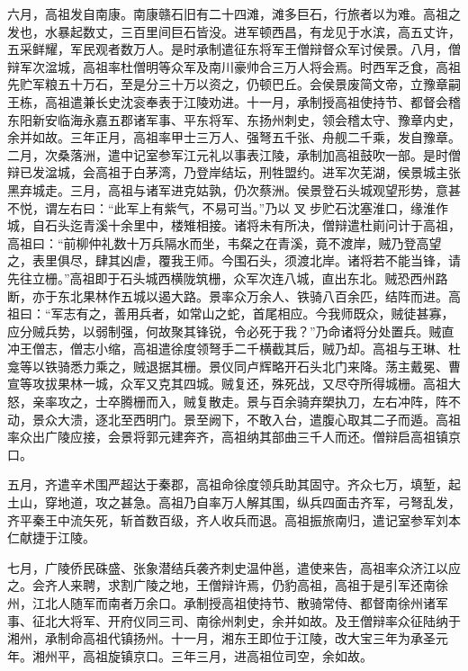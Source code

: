 \documentclass[]{article}
\begin{document}
六月，高祖发自南康。南康赣石旧有二十四滩，滩多巨石，行旅者以为难。高祖之发也，水暴起数丈，三百里间巨石皆没。进军顿西昌，有龙见于水滨，高五丈许，五采鲜耀，军民观者数万人。是时承制遣征东将军王僧辩督众军讨侯景。八月，僧辩军次湓城，高祖率杜僧明等众军及南川豪帅合三万人将会焉。时西军乏食，高祖先贮军粮五十万石，至是分三十万以资之，仍顿巴丘。会侯景废简文帝，立豫章嗣王栋，高祖遣兼长史沈衮奉表于江陵劝进。十一月，承制授高祖使持节、都督会稽东阳新安临海永嘉五郡诸军事、平东将军、东扬州刺史，领会稽太守、豫章内史，余并如故。三年正月，高祖率甲士三万人、强弩五千张、舟舰二千乘，发自豫章。二月，次桑落洲，遣中记室参军江元礼以事表江陵，承制加高祖鼓吹一部。是时僧辩已发湓城，会高祖于白茅湾，乃登岸结坛，刑牲盟约。进军次芜湖，侯景城主张黑弃城走。三月，高祖与诸军进克姑孰，仍次蔡洲。侯景登石头城观望形势，意甚不悦，谓左右曰：``此军上有紫气，不易可当。''乃以叉步贮石沈塞淮口，缘淮作城，自石头迄青溪十余里中，楼雉相接。诸将未有所决，僧辩遣杜崱问计于高祖，高祖曰：``前柳仲礼数十万兵隔水而坐，韦粲之在青溪，竟不渡岸，贼乃登高望之，表里俱尽，肆其凶虐，覆我王师。今围石头，须渡北岸。诸将若不能当锋，请先往立栅。''高祖即于石头城西横陇筑栅，众军次连八城，直出东北。贼恐西州路断，亦于东北果林作五城以遏大路。景率众万余人、铁骑八百余匹，结阵而进。高祖曰：``军志有之，善用兵者，如常山之蛇，首尾相应。今我师既众，贼徒甚寡，应分贼兵势，以弱制强，何故聚其锋锐，令必死于我？''乃命诸将分处置兵。贼直冲王僧志，僧志小缩，高祖遣徐度领弩手二千横截其后，贼乃却。高祖与王琳、杜龛等以铁骑悉力乘之，贼退据其栅。景仪同卢辉略开石头北门来降。荡主戴冕、曹宣等攻拔果林一城，众军又克其四城。贼复还，殊死战，又尽夺所得城栅。高祖大怒，亲率攻之，士卒腾栅而入，贼复散走。景与百余骑弃槊执刀，左右冲阵，阵不动，景众大溃，逐北至西明门。景至阙下，不敢入台，遣腹心取其二子而遁。高祖率众出广陵应接，会景将郭元建奔齐，高祖纳其部曲三千人而还。僧辩启高祖镇京口。

五月，齐遣辛术围严超达于秦郡，高祖命徐度领兵助其固守。齐众七万，填堑，起土山，穿地道，攻之甚急。高祖乃自率万人解其围，纵兵四面击齐军，弓弩乱发，齐平秦王中流矢死，斩首数百级，齐人收兵而退。高祖振旅南归，遣记室参军刘本仁献捷于江陵。

七月，广陵侨民硃盛、张象潜结兵袭齐刺史温仲邕，遣使来告，高祖率众济江以应之。会齐人来聘，求割广陵之地，王僧辩许焉，仍豹高祖，高祖于是引军还南徐州，江北人随军而南者万余口。承制授高祖使持节、散骑常侍、都督南徐州诸军事、征北大将军、开府仪同三司、南徐州刺史，余并如故。及王僧辩率众征陆纳于湘州，承制命高祖代镇扬州。十一月，湘东王即位于江陵，改大宝三年为承圣元年。湘州平，高祖旋镇京口。三年三月，进高祖位司空，余如故。
\end{document}
